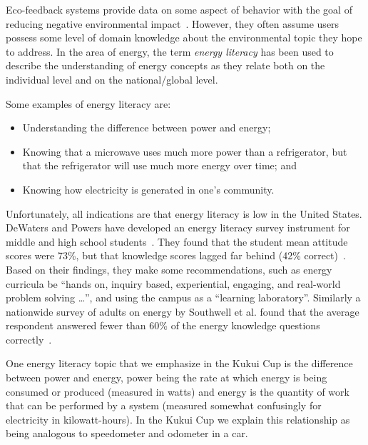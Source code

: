 \documentclass{sigchi}
\begin{document}
Eco-feedback systems provide data on some aspect of behavior with the goal of reducing negative environmental impact~\cite{Froehlich2010}. However, they often assume users possess some level of domain knowledge about the environmental topic they hope to address. In the area of energy, the term \emph{energy literacy} has been used to describe the understanding of energy concepts as they relate both on the individual level and on the national/global level.

Some examples of energy literacy are:

\begin{itemize}
	\item Understanding the difference between power and energy;
	\item Knowing that a microwave uses much more power than a refrigerator, but that the refrigerator will use much more energy over time; and
	\item Knowing how electricity is generated in one's community.
\end{itemize}

Unfortunately, all indications are that energy literacy is low in the United States. DeWaters and Powers have developed an energy literacy survey instrument for middle and high school students~\cite{DeWaters2007,DeWaters2008}. They found that the student mean attitude scores were 73\%, but that knowledge scores lagged far behind (42\% correct)~\cite{DeWaters2011}. Based on their findings, they make some recommendations, such as energy curricula be ``hands on, inquiry based, experiential, engaging, and real-world problem solving \ldots'', and using the campus as a ``learning laboratory''. Similarly a nationwide survey of adults on energy by Southwell et al. found that the average respondent answered fewer than 60\% of the energy knowledge questions correctly~\cite{Southwell2012}.

One energy literacy topic that we emphasize in the Kukui Cup is the difference between power and energy, power being the rate at which energy is being consumed or produced (measured in watts) and energy is the quantity of work that can be performed by a system (measured somewhat confusingly for electricity in kilowatt-hours). In the Kukui Cup we explain this relationship as being analogous to speedometer and odometer in a car.
\end{document}
